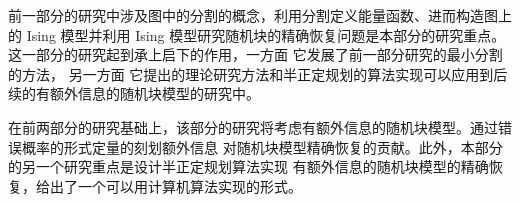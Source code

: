 前一部分的研究中涉及图中的分割的概念，利用分割定义能量函数、进而构造图上的 Ising 模型并利用
Ising 模型研究随机块的精确恢复问题是本部分的研究重点。这一部分的研究起到承上启下的作用，一方面
它发展了前一部分研究的最小分割的方法，
另一方面
它提出的理论研究方法和半正定规划的算法实现可以应用到后续的有额外信息的随机块模型的研究中。

在前两部分的研究基础上，该部分的研究将考虑有额外信息的随机块模型。通过错误概率的形式定量的刻划额外信息
对随机块模型精确恢复的贡献。此外，本部分的另一个研究重点是设计半正定规划算法实现
有额外信息的随机块模型的精确恢复，给出了一个可以用计算机算法实现的形式。
